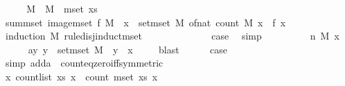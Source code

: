 \begin{isabellebody}
%
\isadelimproof
%
\endisadelimproof
%
\isatagproof
{}\isamarkupfalse%
\ {\isacharminus}{\kern0pt}\isanewline
\ \ \isamarkupfalse%
\ M\ \ {\isachardoublequoteopen}M\ {\isacharequal}{\kern0pt}\ mset\ xs{\isachardoublequoteclose}\isanewline
\ \ \isamarkupfalse%
\ {\isachardoublequoteopen}sum{\isacharunderscore}{\kern0pt}mset\ {\isacharparenleft}{\kern0pt}image{\isacharunderscore}{\kern0pt}mset\ f\ M{\isacharparenright}{\kern0pt}\ {\isacharequal}{\kern0pt}\ {\isacharparenleft}{\kern0pt}{\isasymSum}x\ {\isasymin}\ set{\isacharunderscore}{\kern0pt}mset\ M{\isachardot}{\kern0pt}\ of{\isacharunderscore}{\kern0pt}nat\ {\isacharparenleft}{\kern0pt}count\ M\ x{\isacharparenright}{\kern0pt}\ {\isacharasterisk}{\kern0pt}\ f\ x{\isacharparenright}{\kern0pt}{\isachardoublequoteclose}\isanewline
\ \ \isamarkupfalse%
\ {\isacharparenleft}{\kern0pt}induction\ {\isachardoublequoteopen}M{\isachardoublequoteclose}\ rule{\isacharcolon}{\kern0pt}disj{\isacharunderscore}{\kern0pt}induct{\isacharunderscore}{\kern0pt}mset{\isacharparenright}{\kern0pt}\isanewline
\ \ \ \ \isamarkupfalse%
\ {}\isanewline
\ \ \ \ \isamarkupfalse%
\ \isamarkupfalse%
\ {\isacharquery}{\kern0pt}case\ \isamarkupfalse%
\ simp\isanewline
\ \ \isamarkupfalse%
\isanewline
\ \ \ \ \isamarkupfalse%
\ {\isacharparenleft}{\kern0pt}{}\ n\ M\ x{\isacharparenright}{\kern0pt}\isanewline
\ \ \ \ \isamarkupfalse%
\ a{\isacharcolon}{\kern0pt}{\isachardoublequoteopen}{\isasymAnd}y{\isachardot}{\kern0pt}\ y\ {\isasymin}\ set{\isacharunderscore}{\kern0pt}mset\ M\ {\isasymLongrightarrow}\ y\ {\isasymnoteq}\ x{\isachardoublequoteclose}\ \isamarkupfalse%
\ {}{\isacharparenleft}{\kern0pt}{}{\isacharparenright}{\kern0pt}\ \isamarkupfalse%
\ blast\isanewline
\ \ \ \ \isamarkupfalse%
\ {\isacharquery}{\kern0pt}case\ \isamarkupfalse%
\ {}\ \isamarkupfalse%
\ {\isacharparenleft}{\kern0pt}simp\ add{\isacharcolon}{\kern0pt}a\ \ count{\isacharunderscore}{\kern0pt}eq{\isacharunderscore}{\kern0pt}zero{\isacharunderscore}{\kern0pt}iff{\isacharbrackleft}{\kern0pt}symmetric{\isacharbrackright}{\kern0pt}{\isacharparenright}{\kern0pt}\isanewline
\ \ \isamarkupfalse%
\isanewline
\ \ \isamarkupfalse%
\ \isamarkupfalse%
\ {\isachardoublequoteopen}{\isasymAnd}x{\isachardot}{\kern0pt}\ count{\isacharunderscore}{\kern0pt}list\ xs\ x\ {\isacharequal}{\kern0pt}\ count\ {\isacharparenleft}{\kern0pt}mset\ xs{\isacharparenright}{\kern0pt}\ x{\isachardoublequoteclose}\ \isanewline

\end{isabellebody}

